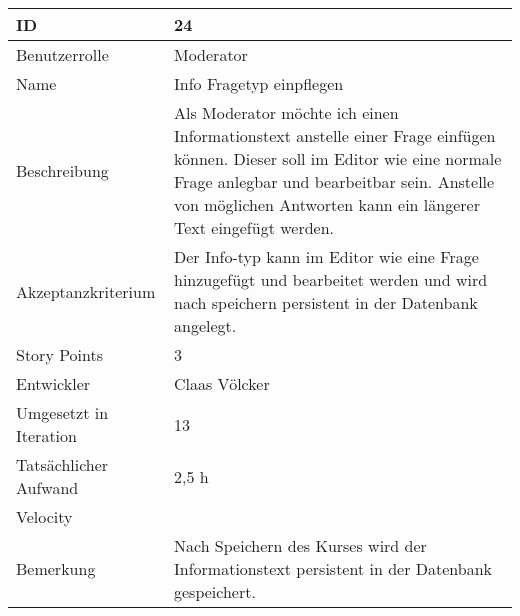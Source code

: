 \begin{tabularx}{\textwidth}{|p{}|X|}
	\hline
	ID & 24 \\
	\hline
	Benutzerrolle & Moderator \\
	\hline
	Name & Info Fragetyp einpflegen\\
	\hline
	Beschreibung & Als Moderator möchte ich einen Informationstext anstelle einer Frage einfügen können.
		Dieser soll im Editor wie eine normale Frage anlegbar und bearbeitbar sein.
		Anstelle von möglichen Antworten kann ein längerer Text eingefügt werden.\\
	\hline
	Akzeptanzkriterium & Der Info-typ kann im Editor wie eine Frage hinzugefügt und bearbeitet werden und wird nach speichern persistent in der Datenbank angelegt. \\
	\hline
	Story Points & 3 \\
	\hline
	Entwickler & Claas Völcker\\
	\hline
	Umgesetzt in Iteration & 13\\
	\hline
	Tatsächlicher Aufwand & 2,5 h\\
	\hline
	Velocity & \\
	\hline
	Bemerkung & Nach Speichern des Kurses wird der Informationstext persistent in der Datenbank gespeichert.\\
	\hline
\end{tabularx}
\vspace{20pt}
